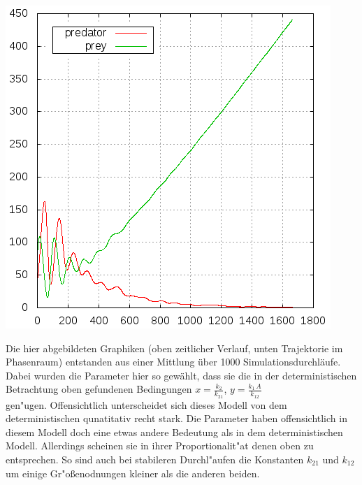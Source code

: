 \documentclass[11pt]{article}
\begin{document}
\begin{minipage}[b]{0.6\textwidth}
\includegraphics[width=\textwidth]{Graphiken/ppm42pop.png}
\end{minipage}
\begin{minipage}[b]{0.4\textwidth}
Die hier abgebildeten Graphiken (oben zeitlicher Verlauf, unten Trajektorie im Phasenraum) entstanden aus einer Mittlung über 1000 Simulationsdurchläufe. Dabei wurden die Parameter hier so gewählt, dass sie die in der deterministischen Betrachtung oben gefundenen Bedingungen
$x=\frac{k_2}{k_{21}}$, $y=\frac{k_1\,A}{k_{12}}$\\
gen"ugen. Offensichtlich unterscheidet sich dieses Modell von dem deterministischen qunatitativ recht stark. Die Parameter haben offensichtlich in diesem Modell doch eine etwas andere Bedeutung als in dem deterministischen Modell. Allerdings scheinen sie in ihrer Proportionalit"at denen oben zu entsprechen. So sind auch bei stabileren Durchl"aufen die Konstanten $k_{21}$ und $k_{12}$ um einige Gr"oßenodnungen kleiner als die anderen beiden. 
\end{minipage}
\end{document}

